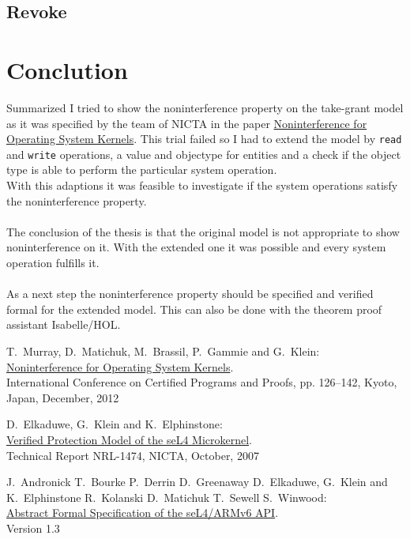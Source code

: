 \documentclass[11pt,a4paper,twoside]{article}
\begin{document}
{\subsection{Revoke}\label{sec:Revoke}
\section{Conclution}
Summarized I tried to show the noninterference property on the take-grant model as it was specified by the team of NICTA in the paper \href{http://www.ssrg.nicta.com/publications/nicta_full_text/6004.pdf}{%
		Noninterference for Operating System Kernels}. This trial failed so I had to extend the model by \texttt{read} and \texttt{write} operations, a value and objectype for entities and a check if the object type is able to perform the particular system operation. \\
		With this adaptions it was feasible to investigate if the system operations satisfy the noninterference property. \\ \\
		The conclusion of the thesis is that the original model is not appropriate to show noninterference on it. With the extended one it was possible and every system operation fulfills it. \\ \\
		As a next step the noninterference property should be specified and verified formal for the extended model. This can also be done with the theorem proof assistant Isabelle/HOL.  
\clearpage
	\begin{thebibliography}{99}

	T.\ Murray, D.\ Matichuk, M.\ Brassil, P.\ Gammie and G.\ Klein:	\\ 
	\href{http://www.ssrg.nicta.com/publications/nicta_full_text/6004.pdf}{%
		Noninterference for Operating System Kernels}. \\
    International Conference on Certified Programs and Proofs, pp. 126–142, Kyoto, Japan, December, 2012

	D.\ Elkaduwe, G.\ Klein and K.\ Elphinstone:	\\ 
	\href{http://ts.data61.csiro.au/publications/nicta_full_text/1474.pdf}{%
		Verified Protection Model of the seL4 Microkernel}. \\
   	Technical Report NRL-1474, NICTA, October, 2007
   	
	J.\ Andronick T.\ Bourke P.\ Derrin D.\ Greenaway D.\ Elkaduwe, G.\ Klein and K.\ Elphinstone R.\ Kolanski D.\ Matichuk T.\ Sewell S.\ Winwood:	\\ 
	\href{https://sel4.systems/Info/Docs/seL4-spec.pdf}{%
		Abstract Formal Specification of the seL4/ARMv6 API}. \\
   	Version 1.3
   	

\end{thebibliography}}
\end{document}
